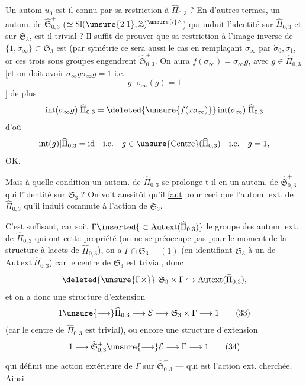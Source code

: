 
Un  autom $u_0$ est-il connu par sa restriction à $\widehat\Pi_{0,3}$ ? En d'autres termes, un autom. de $\widehat{\mathfrak S}_{0,3}^{+}$  ($\simeq\mathrm{Sl}(\unsure{2|1},\mathbb Z)^{\unsure{\prime}\wedge}$) qui induit l'identité sur $\widehat\Pi_{0,3}$ et sur $\mathfrak S_{3}$, est-il trivial ? Il suffit de prouver que sa restriction à l'image inverse  de $\{1,\dot\sigma_\infty\}\subset\mathfrak S_{3}$ est  (par symétrie ce sera aussi le cas en remplaçant $\dot\sigma_\infty$ par $\dot\sigma_0,\dot\sigma_1$, or ces trois sous groupes engendrent $\widehat{\mathfrak S}_{0,3}^{+}$. On aura $f(\sigma_\infty)=\sigma_\infty g$, avec $g\in\widehat\Pi_{0,3}$ [et on doit avoir $\sigma_\infty g\sigma_\infty g=1$ i.e.
\[
g\cdot\sigma_\infty(g)=1
\]
]
de plus  
\[
\operatorname{int}(\sigma_\infty g)\vert\widehat\Pi_{0,3}
=\deleted{\unsure{f(x\sigma_\infty)}}\operatorname{int}(\sigma_\infty)\vert\widehat\Pi_{0,3}
\]
d'où 
\[
\operatorname{int}(g)\vert\widehat\Pi_{0,3}=\mathrm{id}
\quad\text{i.e.}\quad
g\in\unsure{\operatorname{Centre}}(\widehat\Pi_{0,3})
\quad\text{i.e.}\quad g=1,
\]
OK.

Mais à quelle condition un autom. de $\widehat\Pi_{0,3}$  se prolonge-t-il en un autom. de $\widehat{\mathfrak S}_{0,3}^{+}$ qui  l'identité sur $\mathfrak S_{3}$ ? On voit aussitôt qu'il \uline{faut} pour ceci que l'autom. ext. de $\widehat\Pi_{0,3}$ qu'il induit commute à l'action de $\mathfrak S_{3}$.


C'est suffisant, car soit $\Gamma\inserted{{}\subset\mathrm{Aut\,ext}(\widehat{\Pi}_{0,3})}$ le groupe des autom.
ext. de $\widehat{\Pi}_{0,3}$ qui ont cette propriété (on ne
se préoccupe pas pour le moment de la
structure à lacets de $\widehat{\Pi}_{0,3}$), on a
$\Gamma\cap\mathfrak S_3=(1)$ (en identifiant $\mathfrak S_3$ à un
 de $\mathrm{Aut\,ext}\,\widehat{\Pi}_{0,3}$) car  le centre
de $\mathfrak S_3$ est trivial, donc
\[
\deleted{\unsure{\Gamma\times}}\ \mathfrak S_3\times\Gamma\hookrightarrow\mathrm{Autext}(\widehat{\Pi}_{0,3}),
\]
et on a donc une structure d'extension
\[
1\unsure{\longrightarrow}\widehat{\Pi}_{0,3}\longrightarrow\mathcal E\longrightarrow\mathfrak S_3\times\Gamma\longrightarrow1
\tag{33}
\]
(car le centre de $\widehat{\Pi}_{0,3}$ est trivial), ou encore
une structure d'extension
\[
1\longrightarrow\widehat{\mathfrak S}_{0,3}^{+}\unsure{\longrightarrow}\mathcal E\longrightarrow\Gamma\longrightarrow1
\tag{34}
\]
qui définit une action extérieure de $\Gamma$
sur $\widehat{\mathfrak S}_{0,3}^{+}$ --- qui est l'action ext.
cherchée. Ainsi

